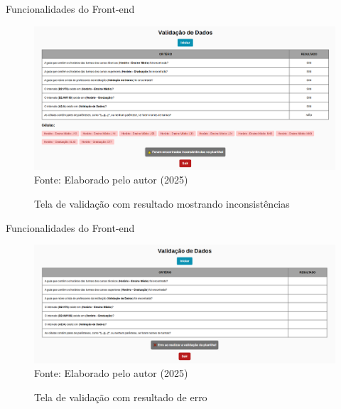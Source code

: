 \begin{frame}{Funcionalidades do Front-end}
    \begin{figure}
        \centering
        \vspace{-0.5cm}
        \caption{Tela de validação com resultado mostrando inconsistências}
        \vspace{-0.2cm}
        \includegraphics[width=1\textwidth]{figuras/front-23.png}
        \\ %
        \small Fonte: Elaborado pelo autor (2025)
    \end{figure}
\end{frame}

\begin{frame}{Funcionalidades do Front-end}
    \begin{figure}
        \centering
        \vspace{-0.5cm}
        \caption{Tela de validação com resultado de erro}
        \vspace{-0.2cm}
        \includegraphics[width=1\textwidth]{figuras/front-24.png}
        \\ %
        \small Fonte: Elaborado pelo autor (2025)
    \end{figure}
\end{frame}

